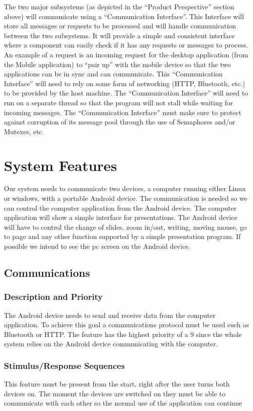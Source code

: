 \documentclass{article}
\begin{document}
The two major subsystems (as depicted in the “Product Perspective” section above) will communicate using a “Communication Interface”. This Interface will store all messages or requests to be processed and will handle communication between the two subsystems. It will provide a simple and consistent interface where a component can easily check if it has any requests or messages to process. An example of a request is an incoming request for the desktop application (from the Mobile application) to “pair up” with the mobile device so that the two applications can be in sync and can communicate. This “Communication Interface” will need to rely on some form of networking (HTTP, Bluetooth, etc.) to be provided by the host machine. The “Communication Interface” will need to run on a separate thread so that the program will not stall while waiting for incoming messages. The “Communication Interface” must make sure to protect against corruption of its message pool through the use of Semaphores and/or Mutexes, etc.

\newpage
\section{System Features}
Our system needs to communicate two devices, a computer running either Linux or windows, with a portable Android device. 
The communication is needed so we can control the computer application from the Android device. 
The computer application will show a simple interface for presentations. 
The Android device will have to control the change of slides, zoom in/out, writing, moving mouse, go to page and any other function supported by a simple presentation program. 
If possible we intend to see the pc screen on the Android device. 

\subsection{Communications}
\subsubsection{Description and Priority}
The Android device needs to send and receive data from the computer application. 
To achieve this goal a communications protocol must be used such as Bluetooth or HTTP. 
The feature has the highest priority of a 9 since the whole system relies on the Android device communicating with the computer.
\subsubsection{Stimulus/Response Sequences}
This feature must be present from the start, right after the user turns both devices on.  
The moment the devices are switched on they must be able to communicate with each other so the normal use of the application can continue
\end{document}
